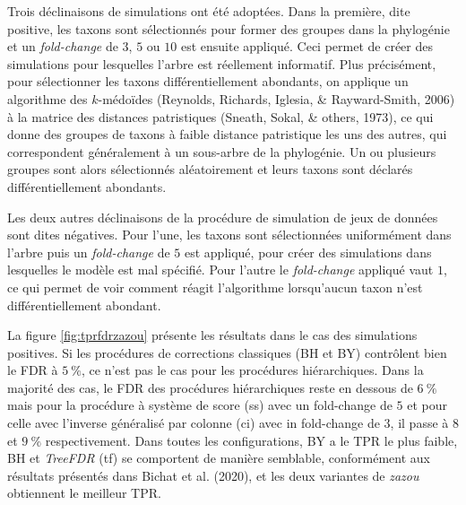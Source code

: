 \documentclass[12pt,a4paper]{reedthesis}
\theoremstyle{definition}
\theoremstyle{definition}
\theoremstyle{definition}
\theoremstyle{remark}
\begin{document}
Trois déclinaisons de simulations ont été adoptées. Dans la première, dite positive, les taxons sont sélectionnés pour former des groupes dans la phylogénie et un \emph{fold-change} de \(3\), \(5\) ou \(10\) est ensuite appliqué. Ceci permet de créer des simulations pour lesquelles l'arbre est réellement informatif. Plus précisément, pour sélectionner les taxons différentiellement abondants, on applique un algorithme des \(k\)-médoïdes (Reynolds, Richards, Iglesia, \& Rayward-Smith, 2006) à la matrice des distances patristiques (Sneath, Sokal, \& others, 1973), ce qui donne des groupes de taxons à faible distance patristique les uns des autres, qui correspondent généralement à un sous-arbre de la phylogénie. Un ou plusieurs groupes sont alors sélectionnés aléatoirement et leurs taxons sont déclarés différentiellement abondants.

Les deux autres déclinaisons de la procédure de simulation de jeux de données sont dites négatives. Pour l'une, les taxons sont sélectionnées uniformément dans l'arbre puis un \emph{fold-change} de \(5\) est appliqué, pour créer des simulations dans lesquelles le modèle est mal spécifié. Pour l'autre le \emph{fold-change} appliqué vaut \(1\), ce qui permet de voir comment réagit l'algorithme lorsqu'aucun taxon n'est différentiellement abondant.

La figure \ref{fig:tprfdrzazou} présente les résultats dans le cas des simulations positives. Si les procédures de corrections classiques (BH et BY) contrôlent bien le FDR à \(5~\%\), ce n'est pas le cas pour les procédures hiérarchiques. Dans la majorité des cas, le FDR des procédures hiérarchiques reste en dessous de \(6~\%\) mais pour la procédure à système de score (ss) avec un fold-change de \(5\) et pour celle avec l'inverse généralisé par colonne (ci) avec in fold-change de \(3\), il passe à \(8\) et \(9~\%\) respectivement. Dans toutes les configurations, BY a le TPR le plus faible, BH et \emph{TreeFDR} (tf) se comportent de manière semblable, conformément aux résultats présentés dans Bichat et al. (2020), et les deux variantes de \emph{zazou} obtiennent le meilleur TPR.
\end{document}
